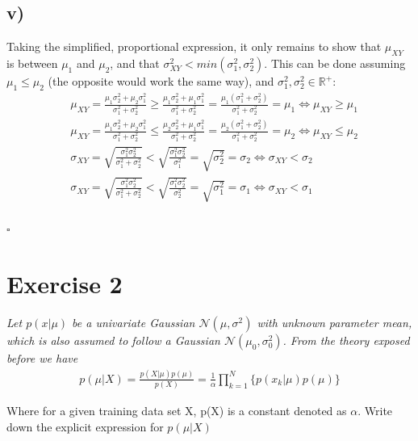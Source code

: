 \documentclass[11pt]{scrartcl} %
\begin{document}
         \subsection*{v)}
         Taking the simplified, proportional expression, it only remains to show that \(\mu_{XY}\) is between \(\mu_1\) and \(\mu_2\), and that \(\sigma_{XY}^2 < min(\sigma_1^2,\sigma_2^2)\). This can be done assuming \(\mu_1 \leq \mu_2\) (the opposite would work the same way), and \(\sigma_1^2, \sigma_2^2 \in \mathbb{R}^+\):
         \begin{equation}\label{eq:1}
           \begin{split}
             &\mu_{XY} = \frac{\mu_1\sigma_2^2+\mu_2\sigma_1^2}{\sigma_1^2+\sigma_2^2} \geq \frac{\mu_1\sigma_2^2+\mu_1\sigma_1^2}{\sigma_1^2+\sigma_2^2} = \frac{\mu_1(\sigma_1^2+\sigma_2^2)}{\sigma_1^2+\sigma_2^2} = \mu_1 \iff \mu_{XY} \geq \mu_1\\
             &\mu_{XY} = \frac{\mu_1\sigma_2^2+\mu_2\sigma_1^2}{\sigma_1^2+\sigma_2^2} \leq \frac{\mu_2\sigma_2^2+\mu_1\sigma_1^2}{\sigma_1^2+\sigma_2^2} = \frac{\mu_2(\sigma_1^2+\sigma_2^2)}{\sigma_1^2+\sigma_2^2} = \mu_2 \iff \mu_{XY} \leq \mu_2\\
             &\sigma_{XY} = \sqrt{\frac{\sigma_1^2\sigma_2^2}{\sigma_1^2+\sigma_2^2}} <
             \sqrt{\frac{\sigma_1^2\sigma_2^2}{\sigma_1^2}} = \sqrt{\sigma_2^2} = \sigma_2 \iff
             \sigma_{XY} < \sigma_2\\
             &\sigma_{XY} = \sqrt{\frac{\sigma_1^2\sigma_2^2}{\sigma_1^2+\sigma_2^2}} <
             \sqrt{\frac{\sigma_1^2\sigma_2^2}{\sigma_2^2}} = \sqrt{\sigma_1^2} = \sigma_1 \iff
             \sigma_{XY} < \sigma_1\\
           \end{split}
         \end{equation}
         \begin{flushright}
           $\square$\\
         \end{flushright}

         

\vspace{5mm}
\section*{Exercise 2}
         {\it Let \(p(x|\mu)\) be a univariate Gaussian \(\mathcal{N}(\mu, \sigma^2)\) with unknown parameter mean, which is also assumed to follow a Gaussian \(\mathcal{N}(\mu_0, \sigma_0^2)\). From the theory exposed before we have
           \begin{align*}
             p(\mu|X) = \frac{p(X|\mu)p(\mu)}{p(X)} = \frac{1}{\alpha}\prod_{k=1}^N\{p(x_k|\mu)p(\mu)\}
           \end{align*}

           Where for a given training data set X, p(X) is a constant denoted as \(\alpha\). Write down the explicit expression for \(p(\mu|X)\)}
\end{document}
